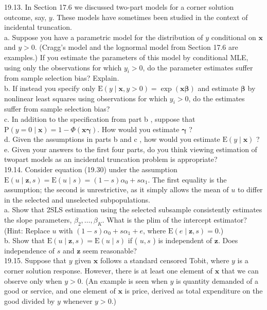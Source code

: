 \documentclass[10pt]{article}
\begin{document}
19.13. In Section 17.6 we discussed two-part models for a corner solution outcome, say, $y$. These models have sometimes been studied in the context of incidental truncation.\\
a. Suppose you have a parametric model for the distribution of $y$ conditional on $\mathbf{x}$ and $y>0$. (Cragg's model and the lognormal model from Section 17.6 are examples.) If you estimate the parameters of this model by conditional MLE, using only the observations for which $y_{i}>0$, do the parameter estimates suffer from sample selection bias? Explain.\\
b. If instead you specify only $\mathrm{E}(y \mid \mathbf{x}, y>0)=\exp (\mathbf{x} \boldsymbol{\beta})$ and estimate $\boldsymbol{\beta}$ by nonlinear least squares using observations for which $y_{i}>0$, do the estimates suffer from sample selection bias?\\
c. In addition to the specification from part b , suppose that $\mathrm{P}(y=0 \mid \mathbf{x})= 1-\Phi(\mathbf{x} \boldsymbol{\gamma})$. How would you estimate $\boldsymbol{\gamma}$ ?\\
d. Given the assumptions in parts b and c , how would you estimate $\mathrm{E}(y \mid \mathbf{x})$ ?\\
e. Given your answers to the first four parts, do you think viewing estimation of twopart models as an incidental truncation problem is appropriate?\\
19.14. Consider equation (19.30) under the assumption $\mathrm{E}(u \mid \mathbf{z}, s)=\mathrm{E}(u \mid s)= (1-s) \alpha_{0}+s \alpha_{1}$. The first equality is the assumption; the second is unrestrictive, as it simply allows the mean of $u$ to differ in the selected and unselected subpopulations.\\
a. Show that 2SLS estimation using the selected subsample consistently estimates the slope parameters, $\beta_{2}, \ldots, \beta_{K}$. What is the plim of the intercept estimator? (Hint: Replace $u$ with $(1-s) \alpha_{0}+s \alpha_{1}+e$, where $\mathrm{E}(e \mid \mathbf{z}, s)=0$.)\\
b. Show that $\mathrm{E}(u \mid \mathbf{z}, s)=\mathrm{E}(u \mid s)$ if ( $u, s$ ) is independent of $\mathbf{z}$. Does independence of $s$ and $\mathbf{z}$ seem reasonable?\\
19.15. Suppose that $y$ given $\mathbf{x}$ follows a standard censored Tobit, where $y$ is a corner solution response. However, there is at least one element of $\mathbf{x}$ that we can observe only when $y>0$. (An example is seen when $y$ is quantity demanded of a good or service, and one element of $\mathbf{x}$ is price, derived as total expenditure on the good divided by $y$ whenever $y>0$.)\\
\end{document}
